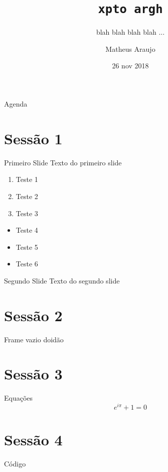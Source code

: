 \documentclass{beamer}
\title{\texttt{xpto argh}}
\subtitle{blah blah blah blah ...}
\author{Matheus Araujo}
\date{26 nov 2018}
\begin{document}
\begin{frame}
  \maketitle
\end{frame}

\begin{frame}{Agenda}
  \tableofcontents
\end{frame}

\section{Sessão 1}

\begin{frame}{Primeiro Slide}
  Texto do primeiro slide
  \pause
  \begin{enumerate}
    \item Teste 1\pause
    \item Teste 2\pause
    \item Teste 3
  \end{enumerate}
  \pause
  \begin{itemize}
    \item Teste 4\pause
    \item Teste 5\pause
    \item Teste 6
  \end{itemize}
\end{frame}

\begin{frame}{Segundo Slide}
  Texto do segundo slide
\end{frame}

\section{Sessão 2}
\begin{frame}
    Frame vazio doidão
\end{frame}

\section{Sessão 3}

\begin{frame}{Equações}
    $$ e^{i\pi} + 1 = 0$$
\end{frame}

\section{Sessão 4}


\begin{frame}{Código}
    \lstI
\end{frame}
\end{document}
